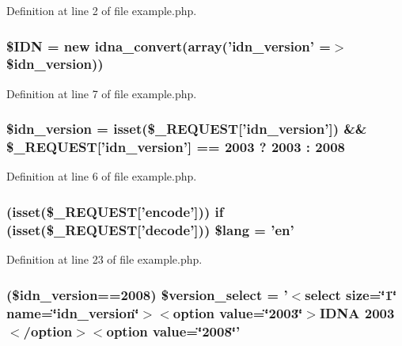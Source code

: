 Definition at line 2 of file example.\-php.

\hypertarget{example_8php_aa45ac61e5ada434ea385befcd1aea16d}{
\subsubsection[{\$\-I\-D\-N}]{\setlength{\rightskip}{0pt plus 5cm}\$I\-D\-N = new {\bf idna\-\_\-convert}(array('idn\-\_\-version' =$>$ \$idn\-\_\-version))}}\label{example_8php_aa45ac61e5ada434ea385befcd1aea16d}


Definition at line 7 of file example.\-php.

\hypertarget{example_8php_aaa64132973e10962c52265cfbee1cb9c}{
\subsubsection[{\$idn\-\_\-version}]{\setlength{\rightskip}{0pt plus 5cm}\$idn\-\_\-version = isset(\$\-\_\-\-R\-E\-Q\-U\-E\-S\-T\mbox{[}'idn\-\_\-version'\mbox{]}) \&\& \$\-\_\-\-R\-E\-Q\-U\-E\-S\-T\mbox{[}'idn\-\_\-version'\mbox{]} == 2003 ? 2003 \-: 2008}}\label{example_8php_aaa64132973e10962c52265cfbee1cb9c}


Definition at line 6 of file example.\-php.

\hypertarget{example_8php_aef99014231eb219a8c774eb4b8463fd9}{
\subsubsection[{\$lang}]{ (isset(\$\-\_\-\-R\-E\-Q\-U\-E\-S\-T\mbox{[}'encode'\mbox{]})) {\bf if} (isset(\$\-\_\-\-R\-E\-Q\-U\-E\-S\-T\mbox{[}'decode'\mbox{]})) \$lang = 'en'}}\label{example_8php_aef99014231eb219a8c774eb4b8463fd9}


Definition at line 23 of file example.\-php.

\hypertarget{example_8php_a13d9753a348e3a016c3d8fb1ac173bbd}{
\subsubsection[{\$version\-\_\-select}]{ (\$idn\-\_\-version==2008) \$version\-\_\-select = '$<$select size=\char`\"{}1\char`\"{} name=\char`\"{}idn\-\_\-version\char`\"{}$>$$<$option value=\char`\"{}2003\char`\"{}$>$I\-D\-N\-A 2003$<$/option$>$$<$option value=\char`\"{}2008\char`\"{}'}}\label{example_8php_a13d9753a348e3a016c3d8fb1ac173bbd}


